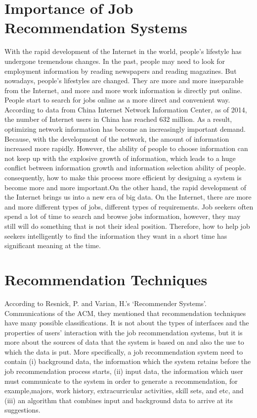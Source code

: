 \documentclass[sigconf]{acmart}
\begin{document}
\section{Importance of Job Recommendation Systems}
With the rapid development of the Internet in the world, people's lifestyle has undergone tremendous changes. In the past, people may need to look for employment information by reading newspapers and reading magazines. But nowadays, people's lifestyles are changed. They are more and more inseparable from the Internet, and more and more work information is directly put online. People start to search for jobs online as a more direct and convenient way. According to data from China Internet Network Information Center, as of 2014, the number of Internet users in China has reached 632 million. As a result, optimizing network information has become an increasingly important demand. Because, with the development of the network, the amount of information increased more rapidly. However, the ability of people to choose information can not keep up with the explosive growth of information, which leads to a huge conflict between information growth and information selection ability of people. consequently, how to make this process more efficient by designing a system is become more and more important.On the other hand, the rapid development of the Internet brings us into a new era of big data. On the Internet, there are more and more different types of jobs, different types of requirements. Job seekers often spend a lot of time to search and browse jobs information, however, they may still will do something that is not their ideal position. Therefore, how to help job seekers intelligently to find the information they want in a short time has significant meaning at the time.


\section{Recommendation Techniques}
According to Resnick, P. and Varian, H.'s ‘Recommender Systems’. Communications of the ACM, they mentioned that recommendation techniques have many possible classifications. It is not about the types of interfaces and the properties of users' interaction with the job recommendation systems, but it is more about the sources of data that the system is based on and also the use to which the data is put. More specifically, a job recommendation system need to contain (i) background data, the information which the
system retains before the job recommendation process starts, (ii) input data, the information which user must communicate to the system in order to generate a recommendation, for example,majors, work history, extracurricular activities, skill sets, and etc, and (iii) an algorithm that combines input and background data to arrive at its suggestions.
\end{document}
